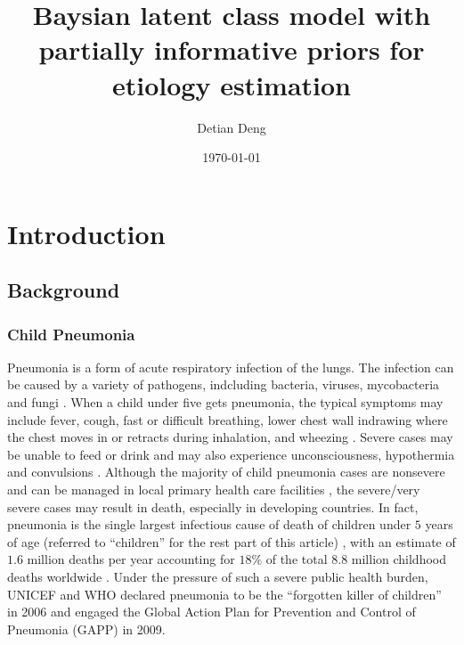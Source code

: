 \documentclass[11 pt, a4paper]{article}  %
\begin{document}
\title{Baysian latent class model with partially informative priors for etiology estimation}   %
\author{Detian Deng}         %
\date{\today}    %
\maketitle

\section{Introduction}
\subsection{Background}
\subsubsection{Child Pneumonia}
Pneumonia is a form of acute respiratory infection of the lungs\cite{WHO}. The infection can be caused by a variety of pathogens, indcluding bacteria, viruses, mycobacteria and fungi \cite{hirama2011prediction}. When a child under five gets pneumonia, the typical symptoms may include fever, cough, fast or difficult breathing, lower chest wall indrawing where the chest moves in or retracts during inhalation, and wheezing \cite{singh2011pneumonia, WHO}. Severe cases may be unable to feed or drink and may also experience unconsciousness, hypothermia and convulsions \cite{WHO}. Although the majority of child pneumonia cases are nonsevere and can be managed in local primary health care facilities \cite{levine2012pneumonia}, the severe/very severe cases may result in death, especially in developing countries. In fact, pneumonia is the single largest infectious cause of death of children under $5$ years of age (referred to ``children'' for the rest part of this article) , with an estimate of $1.6$ million deaths per year accounting for $18\%$ of the total $8.8$ million childhood deaths worldwide \cite{liu2012global, black2010global}. Under the pressure of such a severe public health burden, UNICEF and WHO declared pneumonia to be the ``forgotten killer of children'' in 2006 \cite{unicef2006pneumonia} and engaged the Global Action Plan for Prevention and Control of Pneumonia (GAPP) \cite{world2009global} in 2009. \\
\end{document}

